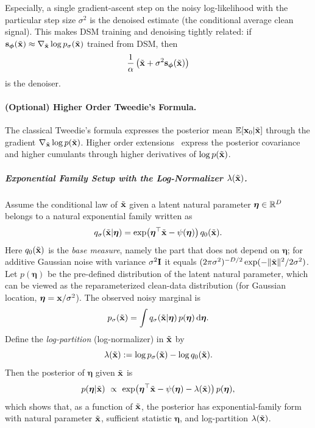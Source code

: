 Especially,  a single gradient-ascent step on the noisy log-likelihood with the particular step size $\sigma^2$
is the denoised estimate (the conditional average clean signal). This makes
DSM training and denoising tightly related: if ${\mathbf{s}}_{\bm{\phi}}(\tilde{{\mathbf{x}}})\approx
\nabla_{\tilde{{\mathbf{x}}}}\log p_\sigma(\tilde{{\mathbf{x}}})$ trained from DSM, then
\[
\frac{1}{\alpha}\left(\tilde{{\mathbf{x}}}+\sigma^2 {\mathbf{s}}_{\bm{\phi}}(\tilde{{\mathbf{x}}})\right)
\]
is the denoiser.

\paragraph{(Optional) Higher Order Tweedie's Formula.} The classical Tweedie's formula expresses the posterior mean $\mathbb{E}[{\mathbf{x}}_0|\tilde{{\mathbf{x}}}]$ through the gradient $\nabla_{\tilde{{\mathbf{x}}}}\log p(\tilde{{\mathbf{x}}})$.
Higher order extensions~\citep{meng2021estimating} express the posterior covariance and higher cumulants through higher derivatives of $\log p(\tilde{{\mathbf{x}}})$.

\subparagraph{Exponential Family Setup with the Log-Normalizer $\lambda(\tilde{{\mathbf{x}}})$.}
Assume the conditional law of $\tilde{{\mathbf{x}}}$ given a latent natural parameter $\boldsymbol\eta\in\mathbb{R}^D$ belongs to a natural exponential family written as
\[
q_\sigma(\tilde{{\mathbf{x}}}|\boldsymbol\eta)
=\exp\!\big(\boldsymbol\eta^\top \tilde{{\mathbf{x}}}-\psi(\boldsymbol\eta)\big)\,q_0(\tilde{{\mathbf{x}}}).
\]
Here $q_0(\tilde{{\mathbf{x}}})$ is the \emph{base measure}, namely the part that does not depend on $\boldsymbol\eta$; for additive Gaussian noise with variance $\sigma^2{\mathbf{I}}$ it equals $(2\pi\sigma^2)^{-D/2}\exp(-\|\tilde{{\mathbf{x}}}\|^2/2\sigma^2)$.
Let $p(\boldsymbol\eta)$ be the pre-defined distribution of the latent natural parameter, which can be viewed as the reparameterized clean-data distribution (for Gaussian location, $\boldsymbol\eta={\mathbf{x}}/\sigma^2$).
The observed noisy marginal is
\[
p_\sigma(\tilde{{\mathbf{x}}})=\int q_\sigma(\tilde{{\mathbf{x}}}|\boldsymbol\eta)\,p(\boldsymbol\eta)\mathop{}\!\mathrm{d}\boldsymbol\eta.
\]
Define the \emph{log-partition} (log-normalizer) in $\tilde{{\mathbf{x}}}$ by
\[
\lambda(\tilde{{\mathbf{x}}}) := \log p_\sigma(\tilde{{\mathbf{x}}})-\log q_0(\tilde{{\mathbf{x}}}).
\]
Then the posterior of $\boldsymbol\eta$ given $\tilde{{\mathbf{x}}}$ is
\[
p(\boldsymbol\eta|\tilde{{\mathbf{x}}})
\ \propto\
\exp\!\big(\boldsymbol\eta^\top \tilde{{\mathbf{x}}}-\psi(\boldsymbol\eta)-\lambda(\tilde{{\mathbf{x}}})\big)\,p(\boldsymbol\eta),
\]
which shows that, as a function of $\tilde{{\mathbf{x}}}$, the posterior has exponential-family form with natural parameter $\tilde{{\mathbf{x}}}$, sufficient statistic $\boldsymbol\eta$, and log-partition  $\lambda(\tilde{{\mathbf{x}}})$.

